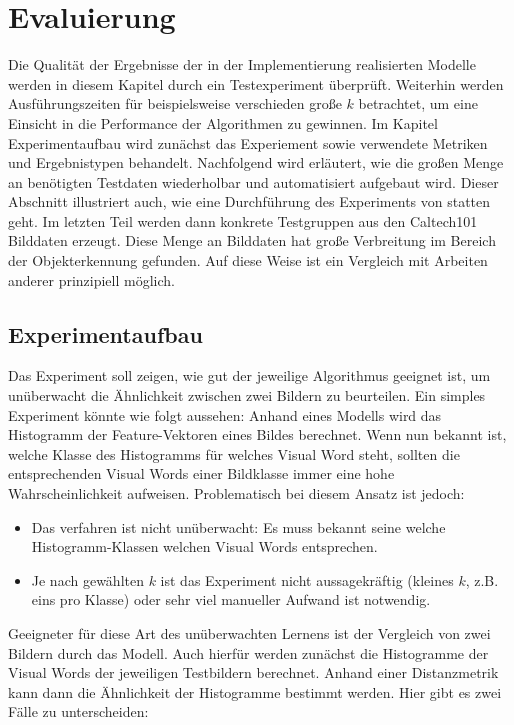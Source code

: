 \chapter{Evaluierung}

Die Qualität der Ergebnisse der in der Implementierung realisierten Modelle werden in diesem Kapitel durch ein Testexperiment überprüft. Weiterhin werden Ausführungszeiten für beispielsweise verschieden große $k$ betrachtet, um eine Einsicht in die Performance der Algorithmen zu gewinnen.
Im Kapitel Experimentaufbau wird zunächst das Experiement sowie verwendete Metriken und Ergebnistypen behandelt. Nachfolgend wird erläutert, wie die großen Menge an benötigten Testdaten wiederholbar und automatisiert aufgebaut wird. Dieser Abschnitt illustriert auch, wie eine Durchführung des Experiments von statten geht. Im letzten Teil werden dann konkrete Testgruppen aus den Caltech101 \cite{cal2004} Bilddaten erzeugt. Diese Menge an Bilddaten hat große Verbreitung im Bereich der Objekterkennung gefunden. Auf diese Weise ist ein Vergleich mit Arbeiten anderer prinzipiell möglich.

\section{Experimentaufbau}

Das Experiment soll zeigen, wie gut der jeweilige Algorithmus geeignet ist, um unüberwacht die Ähnlichkeit zwischen zwei Bildern zu beurteilen. Ein simples Experiment könnte wie folgt aussehen: Anhand eines Modells wird das Histogramm der Feature-Vektoren eines Bildes berechnet. Wenn nun bekannt ist, welche Klasse des Histogramms für welches Visual Word steht, sollten die entsprechenden Visual Words einer Bildklasse immer eine hohe Wahrscheinlichkeit aufweisen. Problematisch bei diesem Ansatz ist jedoch:

\begin{itemize}
	\item Das verfahren ist nicht unüberwacht: Es muss bekannt seine welche Histogramm-Klassen welchen Visual Words entsprechen. 
	\item Je nach gewählten $k$ ist das Experiment nicht aussagekräftig (kleines $k$, z.B. eins pro Klasse) oder sehr viel manueller Aufwand ist notwendig.
\end{itemize}

Geeigneter für diese Art des unüberwachten Lernens ist der Vergleich von zwei Bildern durch das Modell. Auch hierfür werden zunächst die Histogramme der Visual Words der jeweiligen Testbildern berechnet. Anhand einer Distanzmetrik kann dann die Ähnlichkeit der Histogramme bestimmt werden. Hier gibt es zwei Fälle zu unterscheiden:

